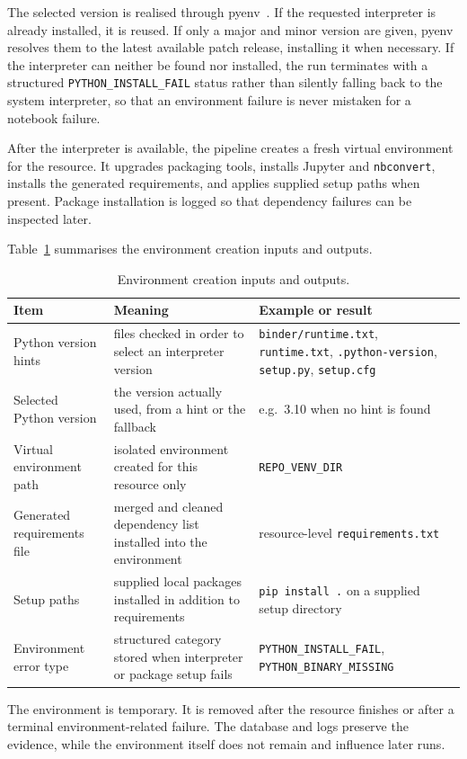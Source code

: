 The selected version is realised through pyenv~\cite{pyenv}. If the requested interpreter is already installed, it is reused. If only a major and minor version are given, pyenv resolves them to the latest available patch release, installing it when necessary. If the interpreter can neither be found nor installed, the run terminates with a structured \texttt{PYTHON\_INSTALL\_FAIL} status rather than silently falling back to the system interpreter, so that an environment failure is never mistaken for a notebook failure.

After the interpreter is available, the pipeline creates a fresh virtual environment for the resource. It upgrades packaging tools, installs Jupyter and \texttt{nbconvert}, installs the generated requirements, and applies supplied setup paths when present. Package installation is logged so that dependency failures can be inspected later.

Table~\ref{tab:environment-inputs-outputs} summarises the environment creation inputs and outputs.

\begin{table}[ht]
\centering
\caption{Environment creation inputs and outputs.}
\label{tab:environment-inputs-outputs}
\small
\begin{tabularx}{\textwidth}{@{}p{3.4cm}p{4.4cm}X@{}}
\toprule
Item & Meaning & Example or result\tabularnewline
\midrule
Python version hints & files checked in order to select an interpreter version & \texttt{binder/runtime.txt}, \texttt{runtime.txt}, \texttt{.python-version}, \texttt{setup.py}, \texttt{setup.cfg}\tabularnewline
Selected Python version & the version actually used, from a hint or the fallback & e.g.\ 3.10 when no hint is found\tabularnewline
Virtual environment path & isolated environment created for this resource only & \texttt{REPO\_VENV\_DIR}\tabularnewline
Generated requirements file & merged and cleaned dependency list installed into the environment & resource-level \texttt{requirements.txt}\tabularnewline
Setup paths & supplied local packages installed in addition to requirements & \texttt{pip install .} on a supplied setup directory\tabularnewline
Environment error type & structured category stored when interpreter or package setup fails & \texttt{PYTHON\_INSTALL\_FAIL}, \texttt{PYTHON\_BINARY\_MISSING}\tabularnewline
\bottomrule
\end{tabularx}
\end{table}

The environment is temporary. It is removed after the resource finishes or after a terminal environment-related failure. The database and logs preserve the evidence, while the environment itself does not remain and influence later runs.

